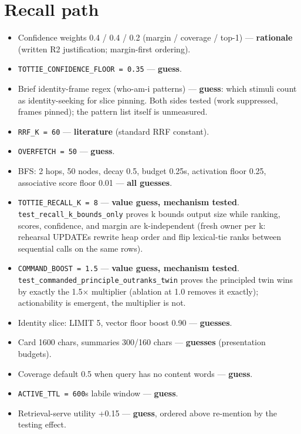 \section{Recall path}

\begin{itemize}
\item Confidence weights 0.4 / 0.4 / 0.2 (margin / coverage / top-1) ---
\textbf{rationale} (written R2 justification; margin-first ordering).
\item \texttt{TOTTIE\_CONFIDENCE\_FLOOR = 0.35} --- \textbf{guess}.
\item Brief identity-frame regex (who-am-i patterns) --- \textbf{guess}:
which stimuli count as identity-seeking for slice pinning. Both sides
tested (work suppressed, frames pinned); the pattern list itself is
unmeasured.
\item \texttt{RRF\_K = 60} --- \textbf{literature} (standard RRF constant).
\item \texttt{OVERFETCH = 50} --- \textbf{guess}.
\item BFS: 2 hops, 50 nodes, decay 0.5, budget 0.25s, activation floor
0.25, associative score floor 0.01 --- \textbf{all guesses}.
\item \texttt{TOTTIE\_RECALL\_K = 8} --- \textbf{value guess, mechanism
tested}. \texttt{test\_recall\_k\_bounds\_only} proves k bounds output
size while ranking, scores, confidence, and margin are k-independent
(fresh owner per k: rehearsal UPDATEs rewrite heap order and flip
lexical-tie ranks between sequential calls on the same rows).
\item \texttt{COMMAND\_BOOST = 1.5} --- \textbf{value guess, mechanism
tested}. \texttt{test\_commanded\_principle\_outranks\_twin} proves the
principled twin wins by exactly the 1.5$\times$ multiplier (ablation at
1.0 removes it exactly); actionability is emergent, the multiplier is
not.
\item Identity slice: LIMIT 5, vector floor boost 0.90 ---
\textbf{guesses}.
\item Card 1600 chars, summaries 300/160 chars --- \textbf{guesses}
(presentation budgets).
\item Coverage default 0.5 when query has no content words ---
\textbf{guess}.
\item \texttt{ACTIVE\_TTL = 600}s labile window --- \textbf{guess}.
\item Retrieval-serve utility +0.15 --- \textbf{guess}, ordered above
re-mention by the testing effect.
\end{itemize}

